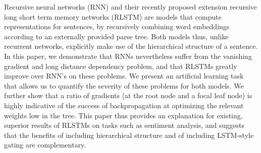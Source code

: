 Recursive neural networks (RNN) and their recently proposed extension recursive long short term memory networks (RLSTM) are models that compute representations for sentences, by recursively combining word embeddings according to an externally provided parse tree. Both models thus, unlike recurrent networks, explicitly make use of the hierarchical structure of a sentence. In this paper, we demonstrate that RNNs nevertheless suffer from the vanishing gradient and long distance dependency problem, and that RLSTMs greatly improve over RNN's on these problems. We present an artificial learning task that allows us to quantify the severity of these problems for both models. We further show that a ratio of gradients (at the root node and a focal leaf node) is highly indicative of the success of backpropagation at optimizing the relevant weights low in the tree. This paper thus provides an explanation for existing, superior results of RLSTMs on tasks such as sentiment analysis, and suggests that the benefits of including hierarchical structure and of including LSTM-style gating are complementary.
